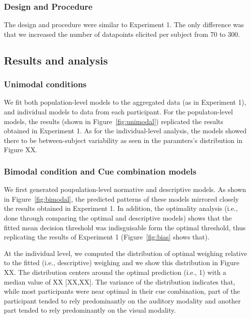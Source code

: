 \documentclass[english,,man,floatsintext]{apa6}
\theoremstyle{definition}
\theoremstyle{definition}
\theoremstyle{definition}
\theoremstyle{remark}
\begin{document}
\subsubsection{Design and Procedure}\label{design-and-procedure-1}

The design and procedure were similar to Experiment 1. The only
difference was that we increased the number of datapoints elicited per
subject from 70 to 300.

\subsection{Results and analysis}\label{results-and-analysis-1}

\subsubsection{Unimodal conditions}\label{unimodal-conditions-2}

We fit both population-level models to the aggregated data (as in
Experiment 1), and individual models to data from each participant. For
the populaton-level models, the results (shown in
Figure~\ref{fig:unimodal}) replicated the results obtained in Experiment
1. As for the individual-level analysis, the models showed there to be
between-subject variability as seen in the paramters's distribution in
Figure XX.

\subsubsection{Bimodal condition and Cue combination
models}\label{bimodal-condition-and-cue-combination-models}

We first generated poupulation-level normative and descriptive models.
As shown in Figure~\ref{fig:bimodal}, the predicted patterns of these
models mirrored closely the results obtained in Experiment 1. In
addition, the optimality analysis (i.e., done through comparing the
optimal and descriptive models) shows that the fitted mean decision
threshold was indisguisable form the optimal threshold, thus replicating
the results of Experiment 1 (Figure~\ref{fig:bias} shows that).

At the individual level, we computed the distribution of optimal
weighing relative to the fitted (i.e., descriptive) weighing and we show
this distribution in Figure XX. The distribution centers around the
optimal prediction (i.e., 1) with a median value of XX {[}XX,XX{]}. The
variance of the distribution indicates that, while most participants
were near optimal in their cue combination, part of the participant
tended to rely predominantly on the auditory modality and another part
tended to rely predominantly on the visual modality.
\end{document}
